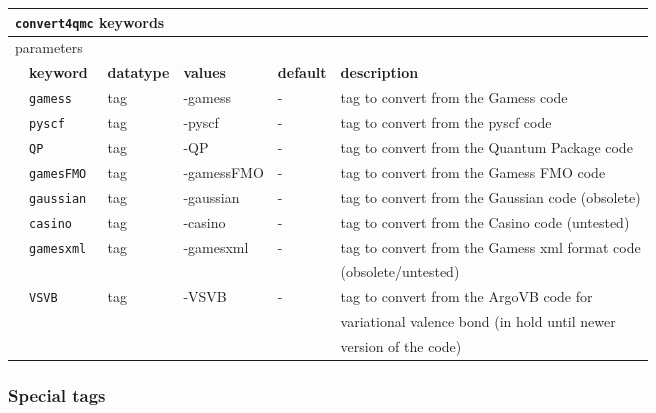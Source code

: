 \begin{table}[h]
\begin{center}
\begin{tabularx}{\textwidth}{l l l l l l }
\hline
\multicolumn{6}{l}{\texttt{convert4qmc} keywords} \\
\hline
\multicolumn{2}{l}{parameters}  & \multicolumn{4}{l}{}\\
   &   \bfseries keyword     & \bfseries datatype & \bfseries values & \bfseries default   & \bfseries description \\
   &   \texttt{gamess             } &  tag  & -gamess & -   & tag to convert from the Gamess code\\
   &   \texttt{pyscf             } &  tag  & -pyscf & -   & tag to convert from the pyscf code\\
   &   \texttt{QP             } &  tag  & -QP & -   & tag to convert from the Quantum Package code\\
   &   \texttt{gamesFMO             } &  tag  & -gamessFMO & -   & tag to convert from the Gamess FMO code\\
   &   \texttt{gaussian             } &  tag  & -gaussian & -   & tag to convert from the Gaussian code (obsolete) \\
   &   \texttt{casino             } &  tag  & -casino & -   & tag to convert from the Casino code (untested)\\
   &   \texttt{gamesxml             } &  tag  & -gamesxml & -   & tag to convert from the Gamess xml format code\\ &&&&&  (obsolete/untested)\\
   &   \texttt{VSVB             } &  tag  & -VSVB & -   & tag to convert from the ArgoVB code for \\ &&&&&variational valence bond  (in hold until newer\\ &&&&& version of the code)\\
    \hline

    \end{tabularx}
\end{center}
\end{table}

\subsubsection{Special tags}

